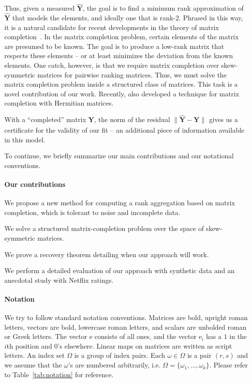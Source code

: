 \documentclass{sig-alternate}
\renewcommand{\cite}{\citep}
\newcommand{\mat}{\boldsymbol}
\renewcommand{\vec}[1]{\boldsymbol{\mathrm{#1}}}
\providecommand{\mYhat}{\ensuremath{\mat{\hat{\mY}}}}
\providecommand{\mY}{\ensuremath{\mat{Y}}}
\providecommand{\ve}{\ensuremath{\vec{e}}}
\newcommand{\nstretchsym}[3]{\ensuremath{#1 #3 #2}}
\newcommand{\nnormof}[2][]{\nstretchsym{\|}{\|}{#2}_{#1}}
\begin{document}
Thus, given a measured $\mYhat$, the goal is to find
a minimum rank approximation of $\mYhat$ that models the elements, and ideally
one that is rank-$2$.  Phrased
in this way, it is a natural candidate for recent developments in the
theory of matrix completion~\cite{candes2009-matrix-completion,recht2009-nuclear-norm}.
In the matrix
 completion problem, certain elements of the matrix are presumed to be known.
 The goal is to produce a low-rank matrix that respects these elements -- or at
  least minimizes the deviation from the known elements.  One catch, 
 however, is that we require
 matrix completion over skew-symmetric matrices for pairwise
ranking matrices.  Thus, we must
solve the matrix completion problem inside a structured class of 
matrices.  This task is a novel contribution of our work.
Recently, \citet{Gross2010-low-rank} also developed a technique
for matrix completion with Hermitian matrices.

With a ``completed'' matrix $\mY$, the norm of the residual $\nnormof{ \mYhat - \mY }$
gives us a certificate for the validity of our fit -- an additional piece of
information available in this model.

To continue, we briefly summarize our main contributions and 
our notational conventions.  

\paragraph{Our contributions}
\begin{compactitem}
 \item We propose a new method for computing a rank aggregation based on 
 matrix completion, which is tolerant to noise and incomplete data.
 \item We solve a structured matrix-completion problem
 over the space  of skew-symmetric matrices.
 \item We prove a recovery theorem detailing when our approach
 will work.
 \item We perform a detailed evaluation of our approach with
   synthetic data and an anecdotal study with Netflix ratings.
\end{compactitem}

\paragraph{Notation} We try to follow standard
notation conventions.  Matrices are bold, upright roman letters, vectors
are bold, lowercase roman letters, and scalars are unbolded roman or Greek
letters.  The vector $\ve$ consists of all ones,
and the vector $\ve_i$ has a $1$ in the $i$th position and $0$'s
elsewhere.
Linear maps on matrices are written as script letters.  
An index set $\Omega$
is a group of index pairs.  Each $\omega \in \Omega$
is a pair $(r,s)$ and we assume that the $\omega$'s are
numbered arbitrarily, i.e. $\Omega = \{ \omega_1, \ldots, \omega_k \}$.
Please refer to Table~\ref{tab:notation} for reference.
\end{document}
